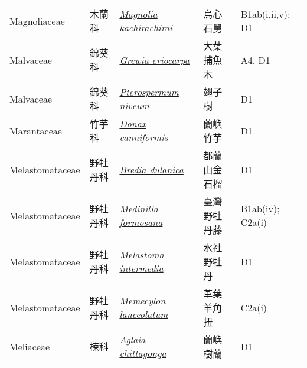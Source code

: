 {\begin{longtable}{L{2.5cm}L{2cm}L{5cm}L{2.5cm}L{3cm}}
    Magnoliaceae & 木蘭科 & \href{http://www.theplantlist.org/tpl1.1/search?q=Magnolia+kachirachirai}{\textit{Magnolia kachirachirai} } & 烏心石舅 & B1ab(i,ii,v); D1    \\
    Malvaceae & 錦葵科 & \href{http://www.theplantlist.org/tpl1.1/search?q=Grewia+eriocarpa}{\textit{Grewia eriocarpa} } & 大葉捕魚木 & A4, D1    \\
    Malvaceae & 錦葵科 & \href{http://www.theplantlist.org/tpl1.1/search?q=Pterospermum+niveum}{\textit{Pterospermum niveum} } & 翅子樹 & D1    \\
    Marantaceae & 竹芋科 & \href{http://www.theplantlist.org/tpl1.1/search?q=Donax+canniformis}{\textit{Donax canniformis} } & 蘭嶼竹芋 & D1    \\
    Melastomataceae & 野牡丹科 & \href{http://www.theplantlist.org/tpl1.1/search?q=Bredia+dulanica}{\textit{Bredia dulanica} } & 都蘭山金石榴 & D1    \\
    Melastomataceae & 野牡丹科 & \href{http://www.theplantlist.org/tpl1.1/search?q=Medinilla+formosana}{\textit{Medinilla formosana} } & 臺灣野牡丹藤 & B1ab(iv); C2a(i)    \\
    Melastomataceae & 野牡丹科 & \href{http://www.theplantlist.org/tpl1.1/search?q=Melastoma+intermedia}{\textit{Melastoma intermedia} } & 水社野牡丹 & D1    \\
    Melastomataceae & 野牡丹科 & \href{http://www.theplantlist.org/tpl1.1/search?q=Memecylon+lanceolatum}{\textit{Memecylon lanceolatum} } & 革葉羊角扭 & C2a(i)    \\
    Meliaceae & 楝科 & \href{http://www.theplantlist.org/tpl1.1/search?q=Aglaia+chittagonga}{\textit{Aglaia chittagonga} } & 蘭嶼樹蘭 & D1    \\

\end{longtable}}
